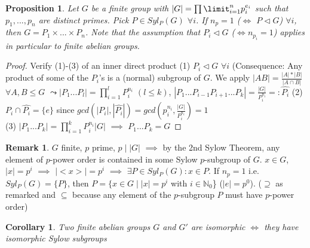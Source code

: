 \documentclass[11pt]{article}
\newtheorem{prop}[thm]{Proposition}
\newtheorem{cor}[thm]{Corollary}
\theoremstyle{definition}
\newtheorem{rem}[thm]{Remark}
\numberwithin{equation}{section}
\newcommand{\N}{\mathbb{N}} %
\begin{document}
\begin{prop}
Let $G$ be a finite group with $|G| = \prod\limit_{i=1}^n p_{i}^{e_{i}}$ such that $p_1, ..., p_n$ are distinct primes. Pick $P \in Syl_{P}(G)$ $\forall i$. If $n_p = 1$ ($\Leftrightarrow$ $P \vartriangleleft G$) $\forall i$, then $G = P_1 \times...\times P_n$. Note that the assumption that $P_i \vartriangleleft G$ ($\Leftrightarrow n_{p_i} = 1$) applies in particular to finite abelian groups.
\end{prop}
\begin{proof}
Verify (1)-(3) of an inner direct product (1) $P_i \vartriangleleft G$ $\forall i$ (Consequence: Any product of some of the $P_i$'s is a (normal) subgroup of $G$. We apply $|AB| = \frac{|A|*|B|}{|A \cap B|}$ $\forall A, B \leq G$ $\leadsto |P_{1}...P_{l}| = \prod\limits_{i=1}^l P_{i}^{n_{i}}$ $(l \leq k)$, $|P_1...P_{i-1}P_{i+1}...P_{k}| = \frac{|G|}{P_{i}^{n_i}} =: \hat{P_{i}}$ (2) $P_i \cap \hat{P_i} = \{e\}$ since $gcd(|P_{i}|, |\hat{P_i}|) = gcd(p_{i}^{n_i}, \frac{|G|}{P_{i}^{n_{i}}}) = 1$\\ (3) $|P_1...P_k| = \prod\limits_{i=1}^{k} P_{i}^{n_i}  |G|$ $\implies$ $P_{1}...P_{k} = G$
\end{proof}
\begin{rem}
$G$ finite, $p$ prime, $p \mid |G|$ $\implies$ by the 2nd Sylow Theorem, any element of $p$-power order is contained in some Sylow $p$-subgroup of $G$. $x \in G$, $|x| = p^{i}$ $\implies$ $|<x>| = p^{i}$ $\implies$ $\exists P \in Syl_{P}(G) : x \in P$. If $n_{p} = 1$ i.e. $Syl_{P}(G) = \{P\}$, then $P = \{x \in G \mid |x| = p^{i}$ with $i \in \N_0$\} ($|e| = p^{0}$). ($\supseteq$ as remarked and $\subseteq$ because any element of the $p$-subgroup $P$ must have $p$-power order)
\end{rem}
\begin{cor}
Two finite abelian groups $G$ and $G'$ are isomorphic $\Leftrightarrow$ they have isomorphic Sylow subgroups
\end{cor}
\end{document}
